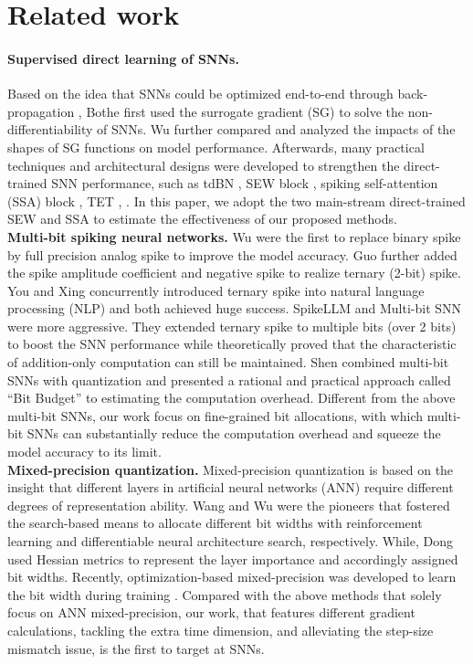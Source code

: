 \section{Related work}
\label{sec:related_work}


\paragraph{Supervised direct learning of SNNs.}
Based on the idea that SNNs could be optimized end-to-end through back-propagation \cite{rumelhart1986learning}, Bothe \etal \cite{bohte2000spikeprop} first used the surrogate gradient (SG) to solve the non-differentiability of SNNs. Wu \etal \cite{wu2018spatio} further compared and analyzed the impacts of the shapes of SG functions on model performance. Afterwards, many practical techniques and architectural designs were developed to strengthen the direct-trained SNN performance, such as tdBN \cite{zheng2021going}, SEW block \cite{fang2021deep}, spiking self-attention (SSA) block \cite{zhou2022spikformer}, TET \cite{deng2021temporal}, \etc. In this paper, we adopt the two main-stream direct-trained SEW and SSA to estimate the effectiveness of our proposed methods.
\\\textbf{Multi-bit spiking neural networks.}
Wu \etal \cite{wu2021liaf} were the first to replace binary spike by full precision analog spike to improve the model accuracy. Guo \etal further added the spike amplitude coefficient \cite{guo2022real} and negative spike \cite{guo2024ternary} to realize ternary (2-bit) spike. You \etal \cite{xing2024spikelm} and Xing \etal \cite{xing2024spikelm} concurrently introduced ternary spike into natural language processing (NLP) and both achieved huge success. SpikeLLM \cite{xing2024spikellm} and Multi-bit SNN \cite{xiao2024multi} were more aggressive. They extended ternary spike to multiple bits (over 2 bits) to boost the SNN performance while theoretically proved that the characteristic of addition-only computation can still be maintained. Shen \etal \cite{shen2024conventional} combined multi-bit SNNs with quantization and presented a rational and practical approach called “Bit Budget” to estimating the computation overhead. Different from the above multi-bit SNNs, our work focus on fine-grained bit allocations, with which multi-bit SNNs can substantially reduce the computation overhead and squeeze the model accuracy to its limit.
\\\textbf{Mixed-precision quantization.}
Mixed-precision quantization is based on the insight that different layers in artificial neural networks (ANN) require different degrees of representation ability. Wang \etal \cite{wang2019haq} and Wu \etal \cite{wu2018mixed} were the pioneers that fostered the search-based means to allocate  different bit widths with reinforcement learning and differentiable neural architecture search, respectively. While, Dong \etal \cite{dong2019hawq} used Hessian metrics to represent the layer importance and accordingly assigned bit widths. Recently, optimization-based mixed-precision was developed to learn the bit width during training \cite{uhlich2019mixed,zhang2021differentiable,huang2022sdq,kim2024metamix}.
Compared with the above methods that solely focus on ANN mixed-precision, our work, that features different gradient calculations, tackling the extra time dimension, and alleviating the step-size mismatch issue, is the first to target at SNNs. 

